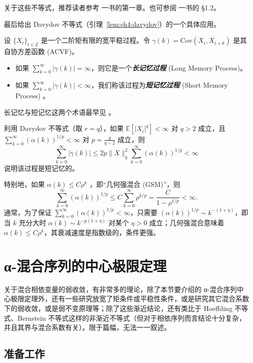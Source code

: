 关于这些不等式，推荐读者参考 \cite{bosq1996} 一书的第一章。也可参阅 \cite{lulingzhengyan1997} 一书的 §1.2。

最后给出 Davydov 不等式（引理~\ref{lem:ch4:davydov}）的一个具体应用。

\begin{definition*}[长记忆与短记忆过程]
设 $\{X_t\}_{t\in\mathbb Z}$ 是一个二阶矩有限的宽平稳过程。令 $\gamma(k)=\mathrm{Cov}(X_i,X_{i+k})$ 是其自协方差函数 (ACVF)。

\begin{itemize}
\tightlist
\item
  如果 $\sum_{k=0}^{\infty} |\gamma(k)| = \infty$，则它是一个\textbf{\emph{长记忆过程}} (Long Memory Process)。
\item
  如果 $\sum_{k=0}^{\infty} |\gamma(k)| < \infty$，我们称该过程为\textbf{\emph{短记忆过程}} (Short Memory Process) 。
\end{itemize}
\end{definition*}

长记忆与短记忆这两个术语最早见 \cite{mcleodhipel1978}。

利用 Davydov 不等式（取 $r = q$），如果 $\mathbb{E}[|X_i|^q ]< \infty$ 对 $q > 2$ 成立，且 $\sum_{k = 0}^{\infty} (\alpha(k))^{1 / p} < \infty$ 对 $p = \frac{q}{q - 2}$ 成立，则
\[\sum_{k=0}^\infty|\gamma(k)|\le 2p\|X\|_q^2\sum_{k=0}^\infty(\alpha(k))^{1/p}<\infty\]
说明该过程是短记忆的。

特别地，如果 $\alpha (k) \leq C \rho^k$ ，即``几何强混合 (GSM)''，则
\[\sum_{k = 0}^{\infty} (\alpha(k))^{1 / p} \leq C \sum_{k = 0}^{\infty} \rho^{k / p} = \frac{C}{1 - \rho^{1 / p}} < \infty .\]
通常，为了保证 $\sum_{k=0}^\infty (\alpha(k))^{1/p} < \infty$，只需要 $(\alpha(k))^{1/p} \sim k^{-(1+\eta)}$，即当 $k$ 充分大时 $\alpha(k) \sim k^{-p(1+\eta)}$ 对某个 $\eta > 0$ 成立；几何强混合意味着 $\alpha(k) \leq C\rho^k$，其衰减速度是指数级的，条件更强。

\section{α-混合序列的中心极限定理}

关于混合相依变量的弱收敛，有非常多的理论，除了本节要介绍的 α-混合序列中心极限定理外，还有一些研究放宽了矩条件或平稳性条件，或是研究其它混合系数下的弱收敛，或是弱不变原理等；除了这些渐近结论，还有类比于 Hoeffding 不等式、Bernstein 不等式这样的非渐近不等式（但对于相依序列而言结论十分复杂，并且其界与混合系数有关）。限于篇幅，无法一一叙述。

\subsection{准备工作}

